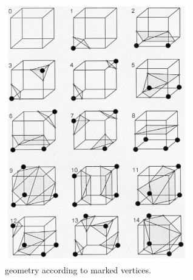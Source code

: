 \documentclass{ACGSeminar}
\begin{document}
\\
\begin{figure}[b!] 
  \begin{centering}
    \includegraphics[width=8cm]{figures/marching_cubes.png}\par 
  \end{centering}
  \caption{geometry according to marked vertices.}
  \label{fig:surf}
\end{figure}
\end{document}
